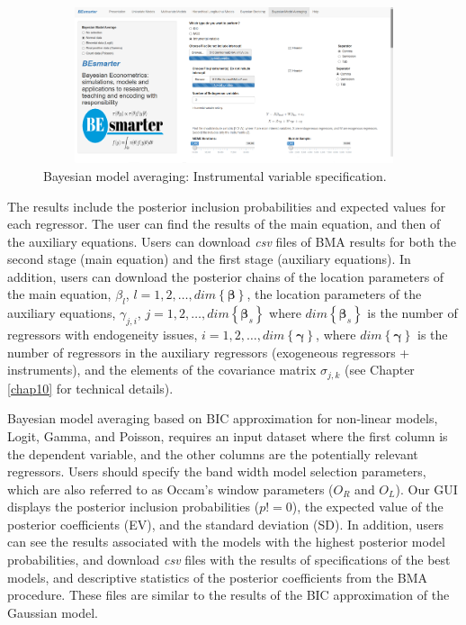 \begin{figure}
	\includegraphics[width=340pt, height=130pt]{Chapters/chapterGUI/figures/Figure10.png}
	\caption[List of figure caption goes here]{Bayesian model averaging: Instrumental variable specification.}\label{fig610}
\end{figure} 

The results include the posterior inclusion probabilities and expected values for each regressor. The user can find the results of the main equation, and then of the auxiliary equations. Users can download \textit{csv} files of BMA results for both the second stage (main equation)  and the first stage (auxiliary equations). In addition, users can download the posterior chains of the location parameters of the main equation, $\beta_{l}$, $l=1,2,\dots,dim\left\{\bm{\beta}\right\}$, the location parameters of the auxiliary equations, $\gamma_{j,i}$, $j=1,2,\dots,dim\left\{\bm{\beta}_s\right\}$ where $dim\left\{\bm{\beta}_s\right\}$ is the number of regressors with endogeneity issues, $i=1,2,\dots,dim\left\{\bm{\gamma}\right\}$, where $dim\left\{\bm{\gamma}\right\}$ is the number of regressors in the auxiliary regressors (exogeneous regressors + instruments), and the elements of the covariance matrix $\sigma_{j,k}$ (see Chapter \ref{chap10} for technical details).

Bayesian model averaging based on BIC approximation for non-linear models, Logit, Gamma, and Poisson, requires an input dataset where the first column is the dependent variable, and the other columns are the potentially relevant regressors. Users should specify the band width model selection parameters, which are also referred to as Occam's window parameters ($O_R$ and $O_L$). Our GUI displays the posterior inclusion probabilities ($p!=0$), the expected value of the posterior coefficients (EV), and the standard deviation (SD). In addition, users can see the results associated with the models with the highest posterior model probabilities, and download \textit{csv} files with the results of specifications of the best models, and descriptive statistics of the posterior coefficients from the BMA procedure. These files are similar to the results of the BIC approximation of the Gaussian model.

